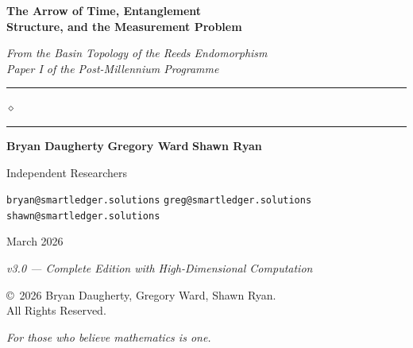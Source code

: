 \documentclass[12pt,a4paper]{article}
\theoremstyle{definition}
\theoremstyle{remark}
\begin{document}
\begin{titlepage}
\centering
\vspace*{3cm}
{\fontsize{28}{34}\selectfont\bfseries\color{u24navy}
  The Arrow of Time, Entanglement\\Structure, and the Measurement Problem\par}
\vspace{0.6cm}
{\Large\itshape\color{u24navy}
  From the Basin Topology of the Reeds Endomorphism\\[4pt]
  Paper I of the Post-Millennium Programme\par}
\vspace{1.2cm}
{\color{u24gold}\rule{8cm}{0.8pt}\par}
\vspace{0.15cm}
{\color{u24gold}$\diamond$\par}
\vspace{0.15cm}
{\color{u24gold}\rule{8cm}{0.8pt}\par}
\vspace{1.2cm}
{\large\color{u24navy}
  \textbf{Bryan Daugherty} \qquad
  \textbf{Gregory Ward} \qquad
  \textbf{Shawn Ryan}\par}
\vspace{0.3cm}
{\normalsize\color{u24navy} Independent Researchers\par}
\vspace{0.15cm}
{\small\color{gray}
  \texttt{bryan@smartledger.solutions} \quad
  \texttt{greg@smartledger.solutions} \quad
  \texttt{shawn@smartledger.solutions}\par}
\vspace{1.2cm}
{\normalsize\color{u24navy} March 2026\par}
\vspace{0.3cm}
{\small\itshape\color{u24navy} v3.0 --- Complete Edition with High-Dimensional Computation\par}
\vfill
{\small\color{gray}
  \copyright\ 2026 Bryan Daugherty, Gregory Ward, Shawn Ryan.\\
  All Rights Reserved.\par}
\end{titlepage}

\newpage\thispagestyle{empty}
\vspace*{8cm}
\begin{center}
{\itshape\color{u24navy} For those who believe mathematics is one.}
\end{center}
\newpage
\end{document}
